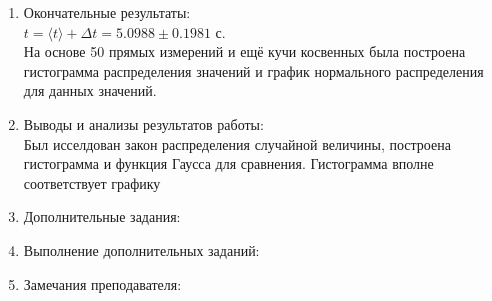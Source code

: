 \documentclass[12pt]{article}
\begin{document}
\begin{enumerate}
    \item Окончательные результаты: \\
    $t = \langle t\rangle + \Delta t = 5.0988 \pm 0.1981$ с. \\
    На основе 50 прямых измерений и ещё кучи косвенных была построена гистограмма распределения значений и график нормального распределения для данных значений.

    \item Выводы и анализы результатов работы: \\
    Был исселдован закон распределения случайной величины, построена гистограмма и функция Гаусса для сравнения. Гистограмма вполне соответствует графику
    
    \item Дополнительные задания:

    \item Выполнение дополнительных заданий:

    \item Замечания преподавателя:    
\end{enumerate}
\end{document}
